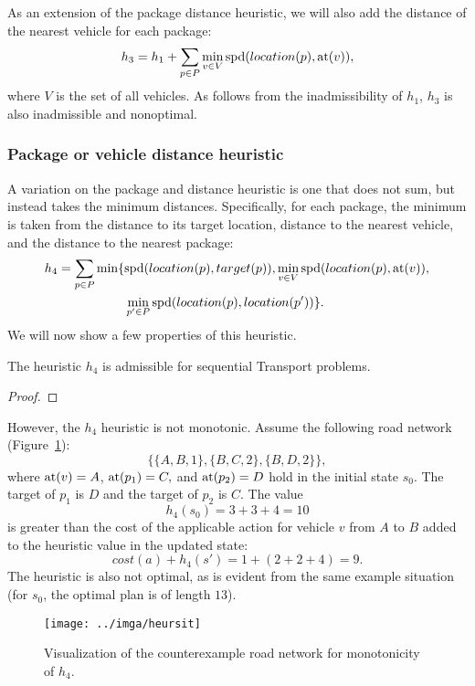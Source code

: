As an extension of the package distance heuristic,
we will also add the distance of the nearest vehicle for
each package:
$$h_3 = h_1 + \sum_{p \in P} \min_{v \in V} \textrm{spd}(location(p), \textrm{at}(v)),$$
where $V$ is the set of all vehicles.
As follows from the inadmissibility of $h_1$, $h_3$
is also inadmissible and nonoptimal.

\subsubsection{Package or vehicle distance heuristic}\label{sfa4}

A variation on the package and distance heuristic
is one that does not sum, but instead takes
the minimum distances.
Specifically, for each package, the minimum
is taken from the distance to its target location,
distance to the nearest vehicle,
and the distance to the nearest package:
\begin{align*}
h_4 = \sum_{p \in P} \min\lbrace
&\textrm{spd}(location(p), target(p)),
\min_{v \in V} \textrm{spd}(location(p), \textrm{at}(v)),\\
&\min_{p' \in P} \textrm{spd}(location(p), location(p'))\rbrace.
\end{align*}
We will now show a few properties of this heuristic.
\begin{thm}
The heuristic $h_4$ is admissible for sequential Transport problems.
\end{thm}
\begin{proof}
\end{proof}

However, the $h_4$ heuristic is not monotonic. Assume the following road network (Figure~\ref{fig:heursit}):
$$\{\{A, B, 1\}, \{B, C, 2\}, \{B, D, 2\}\},$$
where $\textrm{at}(v) = A$, $\textrm{at}(p_1) = C,$ and $\textrm{at}(p_2) = D$
hold in the initial state $s_0$.
The target of $p_1$ is $D$ and the target of $p_2$ is $C$.
The value
$$h_4(s_0) = 3+3+4 = 10$$ is greater than the cost
of the applicable \drive{} action for vehicle $v$ from $A$ to $B$
added to the heuristic value in the updated state:
$$cost(a) + h_4(s') = 1 + (2+2+4) = 9.$$
The heuristic is also not optimal, as is evident from the same
example situation (for $s_0$, the optimal plan is of length $13$).

\begin{figure}[tb]
\centering
\texttt{[image: ../imga/heursit]}
\caption{Visualization of the counterexample road network
for monotonicity of $h_4$.}
\label{fig:heursit}
\end{figure}

